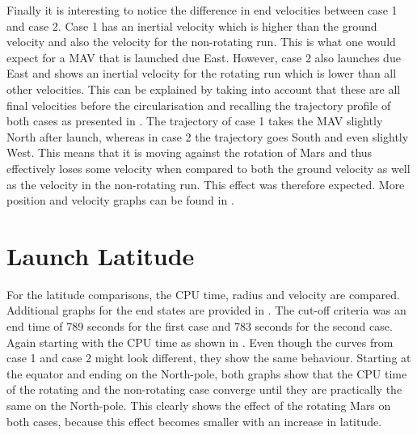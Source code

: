 \noindent
Finally it is interesting to notice the difference in end velocities between case 1 and case 2. Case 1 has an inertial velocity which is higher than the ground velocity and also the velocity for the non-rotating run. This is what one would expect for a \ac{MAV} that is launched due East. However, case 2 also launches due East and shows an inertial velocity for the rotating run which is lower than all other velocities. This can be explained by taking into account that these are all final velocities before the circularisation and recalling the trajectory profile of both cases as presented in . The trajectory of case 1 takes the \ac{MAV} slightly North after launch, whereas in case 2 the trajectory goes South and even slightly West. This means that it is moving against the rotation of Mars and thus effectively loses some velocity when compared to both the ground velocity as well as the velocity in the non-rotating run. This effect was therefore expected.
More position and velocity graphs can be found in .

%





\section{Launch Latitude}
\label{sec:launchLatitude}
For the latitude comparisons, the CPU time, radius and velocity are compared. Additional graphs for the end states are provided in . The cut-off criteria was an end time of 789 seconds for the first case and 783 seconds for the second case. Again starting with the CPU time as shown in . Even though the curves from case 1 and case 2 might look different, they show the same behaviour. Starting at the equator and ending on the North-pole, both graphs show that the CPU time of the rotating and the non-rotating case converge until they are practically the same on the North-pole. This clearly shows the effect of the rotating Mars on both cases, because this effect becomes smaller with an increase in latitude.




